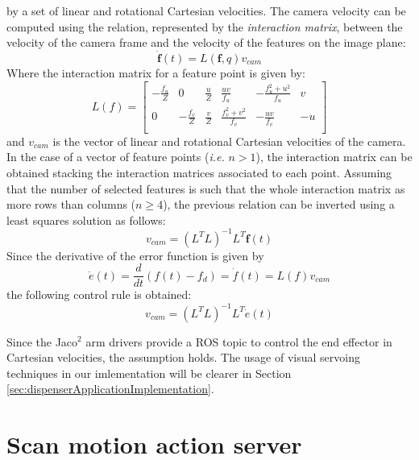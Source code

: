 by a set of linear and rotational Cartesian velocities.
The camera velocity can be computed using the relation, represented by the
\textit{interaction matrix}, between the velocity of the camera frame and the velocity of the features on the image plane:
\[
\dot{\boldsymbol{f}}(t) = L(\boldsymbol{f},q)v_{cam}
\]
Where the interaction matrix for a feature point is given by:
\[
L(f)=
\begin{bmatrix}
-\frac{f_u}{Z}	& 0 				& \frac{u}{Z}	& \frac{uv}{f_u} 		& -\frac{f_u^2+u^2}{f_u} & v \\
0			& -\frac{f_v}{Z}	& \frac{v}{Z}	& \frac{f_v^2+v^2}{f_v} &  -\frac{uv}{f_v} & -u\\
\end{bmatrix}
\]
and $v_{cam}$ is the vector of linear and rotational Cartesian velocities of the camera. In the case of a vector of feature points (\textit{i.e.} $n>1$), the interaction matrix can be obtained stacking the interaction matrices associated to each point.
Assuming that the number of selected features is such that the whole interaction matrix as
more rows than columns ($n\geq4$), the previous relation can be inverted using a least squares solution as follows:
\begin{equation}
	v_{cam}=(L^TL)^{-1}L^T\dot{\boldsymbol{f}}(t)
\end{equation}
Since the derivative of the error function is given by 
\[
	\dot{e}(t)=\frac{d}{dt}(f(t)-f_d) = \dot{f}(t) = L(f)v_{cam}
\]
the following control rule is obtained:
\[
v_{cam}=(L^TL)^{-1}L^T\dot{e}(t)
\]

Since the Jaco$^2$ arm drivers provide a \ac{ROS} topic to control the end effector in Cartesian velocities, the assumption holds. The usage of visual servoing techniques in our imlementation will be clearer in Section \ref{sec:dispenserApplicationImplementation}.

\section{Scan motion action server}


